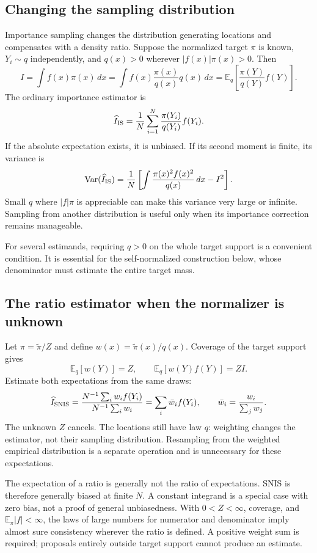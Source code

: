 \documentclass[11pt,a4paper]{article}
\newcommand{\E}{\mathbb E}
\newcommand{\Var}{\operatorname{Var}}
\begin{document}
\subsection{Changing the sampling distribution}
Importance sampling changes the distribution generating locations and
compensates with a density ratio. Suppose the normalized target $\pi$ is
known, $Y_i\sim q$ independently, and $q(x)>0$ wherever
$|f(x)|\pi(x)>0$. Then
\[
 I=\int f(x)\pi(x)\,dx
   =\int f(x)\frac{\pi(x)}{q(x)}q(x)\,dx
   =\E_q\left[\frac{\pi(Y)}{q(Y)}f(Y)\right].
\]
The ordinary importance estimator is
\[
 \widehat I_{\rm IS}=\frac1N\sum_{i=1}^N\frac{\pi(Y_i)}{q(Y_i)}f(Y_i).
\]
If the absolute expectation exists, it is unbiased. If its second moment is
finite, its variance is
\[
 \Var(\widehat I_{\rm IS})=
 \frac1N\left[\int\frac{\pi(x)^2f(x)^2}{q(x)}\,dx-I^2\right].
\]
Small $q$ where $|f|\pi$ is appreciable can make this variance very large or
infinite. Sampling from another distribution is useful only when its
importance correction remains manageable.

For several estimands, requiring $q>0$ on the whole target support is a
convenient condition. It is essential for the self-normalized construction
below, whose denominator must estimate the entire target mass.

\subsection{The ratio estimator when the normalizer is unknown}
Let $\pi=\widetilde\pi/Z$ and define
$w(x)=\widetilde\pi(x)/q(x)$. Coverage of the target support gives
\[
 \E_q[w(Y)]=Z,\qquad \E_q[w(Y)f(Y)]=ZI.
\]
Estimate both expectations from the same draws:
\[
 \widehat I_{\rm SNIS}
 =\frac{N^{-1}\sum_iw_i f(Y_i)}{N^{-1}\sum_iw_i}
 =\sum_i\bar w_i f(Y_i),\qquad
 \bar w_i=\frac{w_i}{\sum_jw_j}.
\]
The unknown $Z$ cancels. The locations still have law $q$: weighting changes
the estimator, not their sampling distribution. Resampling from the weighted
empirical distribution is a separate operation and is unnecessary for these
expectations.

The expectation of a ratio is generally not the ratio of expectations.
SNIS is therefore generally biased at finite $N$. A constant integrand is a
special case with zero bias, not a proof of general unbiasedness. With
$0<Z<\infty$, coverage, and $\E_\pi|f|<\infty$, the laws of large numbers for
numerator and denominator imply almost sure consistency wherever the ratio
is defined. A positive weight sum is required; proposals entirely outside
target support cannot produce an estimate.
\end{document}
